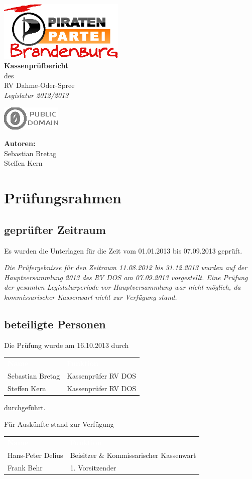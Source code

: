 \documentclass[%
	titlepage,oneside,12pt,headlines=1.5,numbers=noenddot, chapterprefix=false,parskip=full-,DIV=14,pagesize,headings=small]{scrreprt}
\makeatletter
\newcommand*\@lizenz{
		\includegraphics[scale=2.5]{./pd.eps}
	}
\renewcommand\maketitle{
	\begingroup
		\begin{titlepage}
			\begin{center}
					\includegraphics[width=6cm]{logo}\\[4cm]
				{\bfseries
					\makeatletter
						\Huge Kassenprüfbericht
					\makeatother
				}\\[5mm]
				\makeatletter
					{\Large des}\\[5mm]
					{\Large RV Dahme-Oder-Spree}\\[50mm]
					\textit{\Large Legislatur 2012/2013 }
				\makeatother
					
			\end{center}
    		\vspace*{\fill} 
    		\begin{minipage}[b]{8cm}
    		\begin{flushleft}
    			\makeatletter
    				\@lizenz
    			\makeatother
    		\end{flushleft}
    	\end{minipage}
    		\hfill
    		\begin{minipage}[b]{8cm} 
    			\begin{flushright}
    				\textbf{Autoren:}\\[2mm]
    				Sebastian Bretag\\
    				Steffen Kern
    			\end{flushright}
    		\end{minipage}
    	\end{titlepage}
	\endgroup
	\pagebreak
	\onehalfspacing 
	\pagenumbering{arabic}
	\setcounter{page}{1}
	\tableofcontents
	\pagebreak
}
\makeatother
\begin{document}
 
\maketitle

\chapter{Prüfungsrahmen}
\section{geprüfter Zeitraum}
Es wurden die Unterlagen für die Zeit vom 01.01.2013 bis 07.09.2013 geprüft.

\textit{Die Prüfergebnisse für den Zeitraum 11.08.2012 bis 31.12.2013 wurden auf der Hauptversammlung 2013 des RV DOS am 07.09.2013 vorgestellt. Eine Prüfung der gesamten Legislaturperiode vor Hauptversammlung war nicht möglich, da kommissarischer Kassenwart nicht zur Verfügung stand.}
\section{beteiligte Personen}
Die Prüfung wurde am 16.10.2013 durch
\renewcommand{\arraystretch}{1.2}%
\setlength{\arrayrulewidth}{1.5pt}%
%
\begin{longtable}[ht]{|p{} p{}|}
\hline\rowcolor{pirateorange} 
	\textcolor{white}{\textbf{Name}} & \textcolor{white}{\textbf{Funktion}}  \\
        Sebastian Bretag & Kassenprüfer RV DOS \\ 
        Steffen Kern  & Kassenprüfer RV DOS  \\
\hline
\end{longtable}\vspace{-1.25em}
durchgeführt.

Für Auskünfte stand zur Verfügung
\renewcommand{\arraystretch}{1.2}%
\setlength{\arrayrulewidth}{1.5pt}%
%
\begin{longtable}[ht]{|p{} p{}|}
\hline\rowcolor{pirateorange} 
	\textcolor{white}{\textbf{Name}} & \textcolor{white}{\textbf{Funktion}}  \\
        Hans-Peter Delius & Beisitzer \& Kommissarischer Kassenwart  \\ 
        Frank Behr & 1. Vorsitzender \\\hline
\end{longtable}\vspace{-1.25em}
\end{document}
